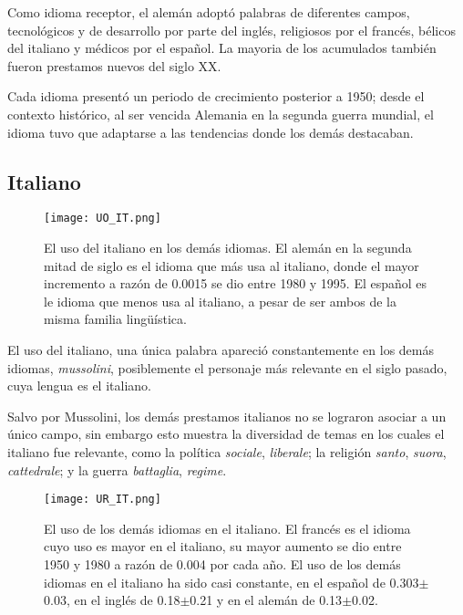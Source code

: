 Como idioma receptor, el alemán adoptó palabras de diferentes campos, tecnológicos y de desarrollo por parte del inglés,  religiosos  por el francés, bélicos del italiano y médicos por el español. La mayoria de los acumulados también fueron prestamos nuevos del siglo XX. 

Cada idioma presentó un periodo de crecimiento posterior a 1950; desde el contexto histórico, al ser vencida Alemania en la segunda guerra mundial, el idioma tuvo que adaptarse a las tendencias donde los demás destacaban. 





\subsection{Italiano} %

\begin{figure}[h!]
	\centering
	\texttt{[image: UO\_IT.png]}
	\caption{El uso del italiano en los demás idiomas. El alemán en la segunda mitad de siglo  es el idioma que más usa al italiano, donde el mayor incremento a razón de 0.0015 se dio entre 1980 y 1995. El español es le idioma que menos usa al italiano, a pesar de ser ambos de la misma familia lingüística.}
	\label{fig.UO_IT}
\end{figure}
		
		
El uso del italiano, una única palabra apareció constantemente en los demás idiomas, \textit{mussolini}, posiblemente el personaje más relevante en el siglo pasado, cuya lengua es el italiano.  

Salvo por Mussolini, los demás prestamos italianos no se lograron asociar a un único campo, sin embargo esto muestra la diversidad de temas en los cuales el italiano fue relevante, como la política \textit{sociale}, \textit{liberale}; la religión \textit{santo}, \textit{suora}, \textit{cattedrale}; y la guerra \textit{battaglia}, \textit{regime}.


\begin{figure}[h!]
	\centering
	\texttt{[image: UR\_IT.png]}
	\caption{El uso de los demás idiomas en el italiano. El francés es el idioma cuyo uso es mayor en el italiano,  su mayor aumento se dio  entre 1950 y 1980 a razón de 0.004 por cada año. El uso de los demás idiomas en el italiano ha sido casi constante, en el español de 0.303$\pm$0.03, en el inglés de 0.18$\pm$0.21 y en el alemán de 0.13$\pm$0.02.}
	\label{fig.UR_IT}
\end{figure}

